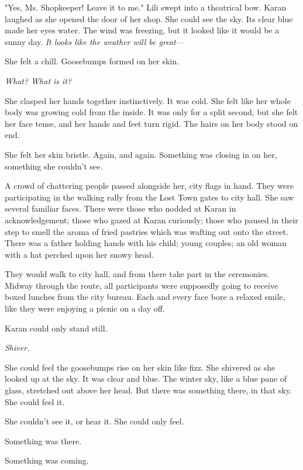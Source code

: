 "Yes, Ms. Shopkeeper! Leave it to me." Lili swept into a theatrical bow.
Karan laughed as she opened the door of her shop. She could see the sky.
Its clear blue made her eyes water. The wind was freezing, but it looked
like it would be a sunny day. \emph{It looks like the weather will be great---}

She felt a chill. Goosebumps formed on her skin.

\emph{What? What is it?}

She clasped her hands together instinctively. It was cold. She felt like
her whole body was growing cold from the inside. It was only for a split
second, but she felt her face tense, and her hands and feet turn rigid.
The hairs on her body stood on end.

She felt her skin bristle. Again, and again. Something was closing in on
her, something she couldn't see.

A crowd of chattering people passed alongside her, city flags in hand.
They were participating in the walking rally from the Lost Town gates to
city hall. She saw several familiar faces. There were those who nodded
at Karan in acknowledgement; those who gazed at Karan curiously; those
who paused in their step to smell the aroma of fried pastries which was
wafting out onto the street. There was a father holding hands with his
child; young couples; an old woman with a hat perched upon her snowy
head.

They would walk to city hall, and from there take part in the
ceremonies. Midway through the route, all participants were supposedly
going to receive boxed lunches from the city bureau. Each and every face
bore a relaxed smile, like they were enjoying a picnic on a day off.

Karan could only stand still.

\emph{Shiver.}

She could feel the goosebumps rise on her skin like fizz. She shivered
as she looked up at the sky. It was clear and blue. The winter sky, like
a blue pane of glass, stretched out above her head. But there was
something there, in that sky. She could feel it.

She couldn't see it, or hear it. She could only feel.

Something was there.

Something was coming.


